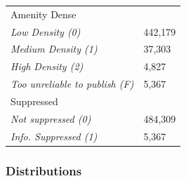 \documentclass[11pt, a4paper]{article}
\begin{document}
\begin{table}[H]
\begin{tabular}{|l|l|}
{Amenity Dense} &  \\
\hspace{2pc} \textit{Low Density (0)} & 442,179 \\
\hspace{2pc} \textit{Medium Density (1)} & 37,303 \\
\hspace{2pc} \textit{High Density (2)} & 4,827 \\
\hspace{2pc} \textit{Too unreliable to publish (F)} & 5,367 \\
\hline

{Suppressed} &  \\
\hspace{2pc} \textit{Not suppressed (0)} & 484,309 \\
\hspace{2pc} \textit{Info. Suppressed (1)} & 5,367 \\
\hline
\end{tabular}
\end{table}







\subsubsection{Distributions}
\end{document}
